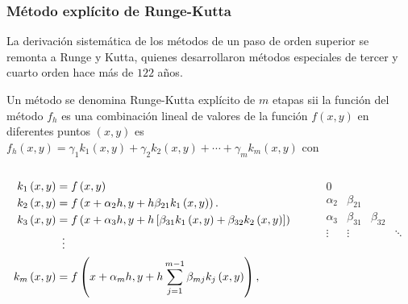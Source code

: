 \begin{frame}
	\frametitle{Método explícito de Runge-Kutta}
	La derivación sistemática de los métodos de un paso de orden
	superior se remonta a Runge y Kutta, quienes desarrollaron métodos
	especiales de tercer y cuarto orden hace más de $122$ años.

	\begin{definition}
		Un método se denomina \alert{Runge-Kutta explícito de $m$ etapas}
		sii la función del método $f_{h}$ es una combinación lineal de
		valores de la función $f\left(x,y\right)$ en diferentes puntos
		$\left(x,y\right)$ es
		\begin{math}
			f_{h}\left(x,y\right)=
			\gamma_{1}k_{1}\left(x,y\right)+
			\gamma_{2}k_{2}\left(x,y\right)+
			\cdots+
			\gamma_{m}k_{m}\left(x,y\right)
		\end{math}
		con
		\begin{columns}
			\begin{column}{0.48\textwidth}
				\begin{align*}
					k_{1}\left(x,y\right) & =
					f\left(
					x,y
					\right)                                 \\
					k_{2}\left(x,y\right) & =
					f\left(
					x+\alpha_{2}h,
					y+h\beta_{21}k_{1}\left(x,y\right)
					\right).                                \\
					k_{3}\left(x,y\right) & =
					f\left(
					x+\alpha_{3}h,
					y+h\left[\beta_{31}k_{1}\left(x,y\right)+\beta_{32}k_{2}\left(x,y\right)\right]
					\right)                                 \\
					                      & \vdotswithin{=} \\
					k_{m}\left(x,y\right) & =
					f\left(x+\alpha_{m}h,y+h\sum\limits_{j=1}^{m-1}\beta_{mj}k_{j}\left(x,y\right)\right),
				\end{align*}
			\end{column}
			\begin{column}{0.48\textwidth}
				\begin{equation*}
					\begin{array}
						{c|ccccc}
						0                                                                    \\
						\alpha_{2} & \beta_{21}                                              \\
						\alpha_{3} & \beta_{31} & \beta_{32}                                 \\
						\vdots     & \vdots     &            & \ddots                        \\

\end{array}
\end{equation*}
\end{column}
\end{columns}
\end{definition}
\end{frame}
